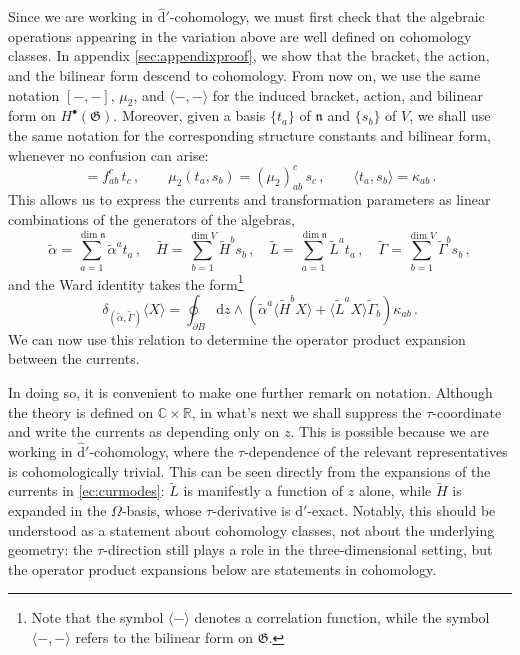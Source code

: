 \documentclass[11pt]{amsart}
\newcommand{\R}{{\mathbb R}}
\newcommand{\C}{{\mathbb C}}
\newcommand{\tL}{{\tilde L}}
\newcommand{\ta}{{\tilde \alpha}}
\newcommand{\tg}{{\tilde \Gamma}}
\newcommand{\tH}{{\tilde H}}
\newcommand{\dr}{{\mathrm{d}}}
\newcommand{\fn}{\mathfrak{n}}
\newcommand{\fG}{\mathfrak{G}}
\numberwithin{equation}{section}
\numberwithin{figure}{section}
\numberwithin{table}{section}
\renewcommand{\d}{\mathrm{d}}
\theoremstyle{thm}
\numberwithin{equation}{subsection}
\theoremstyle{definition}
\theoremstyle{rem}
\begin{document}
Since we are working in $\hat{\d}'$-cohomology, we must first check that the algebraic operations appearing in the variation above are well defined on cohomology classes. In appendix \ref{sec:appendixproof}, we show that the bracket, the action, and the bilinear form descend to cohomology. From now on, we use the same notation $[-,-]$, $\mu_2$, and $\langle-,-\rangle$ for the induced bracket, action, and bilinear form on $H^\bullet(\fG)$. Moreover, given a basis \( \{t_a\} \) of \( \mathfrak{n} \) and \( \{s_b\} \) of \( V \), we shall use the same notation for the corresponding structure constants and bilinear form, whenever no confusion can arise:
\begin{equation}
    [t_a, t_b] = f_{ab}^c\, t_c\,, \qquad 
    \mu_2(t_a, s_b) = (\mu_2)_{ab}^c\, s_c\,, \qquad 
    \langle t_a, s_b \rangle = \kappa_{ab}\,.
\end{equation}
This allows us to express the currents and transformation parameters as linear combinations of the generators of the algebras,
\begin{equation}
    \ta= \sum_{a=1}^{\dim \fn}\ta^a t_a \,,\quad \tH = \sum_{b=1}^{\dim V}\tH^b s_b \,, \quad \tL = \sum_{a=1}^{\dim \fn}\tL^a t_a\,,\quad \tg=\sum_{b=1}^{\dim V}\tg^b s_b \,,
\end{equation}
and the Ward identity takes the form\footnote{Note that the symbol $\langle-\rangle$ denotes a correlation function, while the symbol $\langle-,-\rangle$ refers to the bilinear form on $\fG$. 
}
\begin{equation}
    \delta_{(\ta,\tg)}\langle X\rangle = \oint_{\partial B} \dr z\wedge \left(\ta^a\langle \tH^b X\rangle + \langle \tL^aX\rangle \tg_b\right)\kappa_{ab}\,.
\end{equation}
We can now use this relation to determine the operator product expansion between the currents. 

In doing so, it is convenient to make one further remark on notation. Although the theory is defined on $\C\times\R$, in what's next we shall suppress the $\tau$-coordinate and write the currents as depending only on $z$. This is possible because we are working in $\hat{\d}'$-cohomology, where the $\tau$-dependence of the relevant representatives is cohomologically trivial. This can be seen directly from the expansions of the currents in \eqref{ec:curmodes}: $\tL$ is manifestly a function of $z$ alone, while $\tH$ is expanded in the $\Omega$-basis, whose $\tau$-derivative is $\d'$-exact. Notably, this should be understood as a statement about cohomology classes, not about the underlying geometry: the $\tau$-direction still plays a role in the three-dimensional setting, but the operator product expansions below are statements in cohomology.
\end{document}
